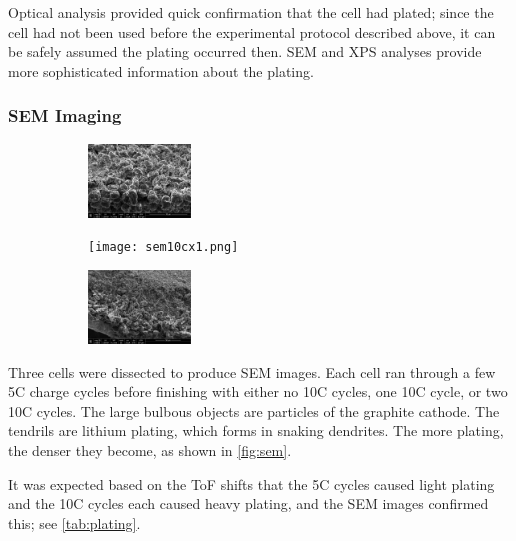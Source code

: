 Optical analysis provided quick confirmation that the cell had plated; since the cell had not been used before the experimental protocol described above, it can be safely assumed the plating occurred then. SEM and XPS analyses provide more sophisticated information about the plating. 

\subsubsection{SEM Imaging}
\begin{figure}[t!]\label{fig:sem}
\centering
\caption{SEM images of cells after experiencing a few 5C cycles and either zero (left), one (center), or two (right) 10C cycles.}
     \begin{subfigure}
         \centering
         \includegraphics[width=0.3\textwidth]{sem5c.png}
     \end{subfigure}
     \hfill
     \begin{subfigure}
         \centering
         \texttt{[image: sem10cx1.png]}
     \end{subfigure}
     \hfill
     \begin{subfigure}
         \centering
         \includegraphics[width=0.3\textwidth]{sem10cx2.png}
     \end{subfigure}
\end{figure}

Three cells were dissected to produce SEM images. Each cell ran through a few 5C charge cycles before finishing with either no 10C cycles, one 10C cycle, or two 10C cycles. 
The large bulbous objects are particles of the graphite cathode. The tendrils are lithium plating, which forms in snaking dendrites. 
The more plating, the denser they become, as shown in \hyperref[fig:sem]{\cref{fig:sem}}.  

It was expected based on the ToF shifts that the 5C cycles caused light plating and the 10C cycles each caused heavy plating, and the SEM images confirmed this; see \hyperref[tab:plating]{\cref{tab:plating}}. 

